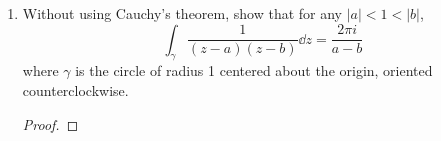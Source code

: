 \documentclass[../psets.tex]{subfiles}
\begin{document}
\begin{enumerate}[ref={A.\arabic*}]
\begin{proof}
        To evaluate such a line integral over a circle centered at the origin with counterclockwise orientation, we may use the parameterization $\gamma:[0,2\pi)\to\C$ defined by
        \begin{equation*}
            \gamma(t) = a\e[it]
        \end{equation*}
        where $a$ is an arbitrary positive real number. Thus, since $\gamma'(t)=ai\e[it]$, we have the following when $n\neq -1$.
        \begin{align*}
            \int_\gamma z^n\dd{z} &= \int_0^{2\pi}(a\e[it])^n\cdot ai\e[it]\dd{t}\\
            &= a^{n+1}i\int_0^{2\pi}\e[i(n+1)t]\dd{t}\\
            &= a^{n+1}i\left[ \frac{\e[i(n+1)t]}{i(n+1)} \right]_0^{2\pi}\\
            &= a^{n+1}i\left[ \frac{1}{i(n+1)}-\frac{1}{i(n+1)} \right]\\
            \Aboxed{\int_\gamma z^n\dd{z} &= 0}\tag{$n\neq -1$}
        \end{align*}
        When $n=-1$, we have
        \begin{align*}
            \int_\gamma\frac{1}{z}\dd{z} &= \int_0^{2\pi}a^{-1}\e[-it]\cdot ai\e[it]\dd{t}\\
            &= \int_0^{2\pi}i\dd{t}\\
            \Aboxed{\int_\gamma z^{-1}\dd{z} &= 2\pi i}
        \end{align*}
    \end{proof}
    \item Without using Cauchy's theorem, show that for any $|a|<1<|b|$,
    \begin{equation*}
        \int_\gamma\frac{1}{(z-a)(z-b)}\dd{z} = \frac{2\pi i}{a-b}
    \end{equation*}
    where $\gamma$ is the circle of radius 1 centered about the origin, oriented counterclockwise.
    \begin{proof}
        



\end{proof}
\end{enumerate}
\end{document}
